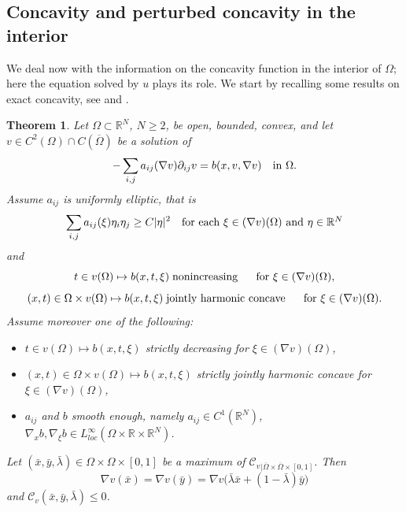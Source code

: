 \documentclass[11pt, reqno]{amsart}
\newtheorem{theorem}[lemma]{Theorem}
\theoremstyle{definition}
\numberwithin{equation}{section}
\newcommand{\R}{\mathbb{R}}
\newcommand{\mc}[1]{\mathcal{#1}}
\begin{document}
 \subsection{Concavity and perturbed concavity in the interior}
\label{sec_concav_interior}

We deal now with the information on the concavity function in the interior of $\Omega$; here the equation solved by $u$ plays its role.
We start by recalling some results on exact concavity, see \cite[Theorem 3.1]{Ken85} and \cite[Proposition 2.1]{MRS24}.

\begin{theorem}
\label{thm_concav_inter_class}
Let $\Omega \subset \R^N$, $N\geq 2$, be open, bounded, 
convex, and let $v \in C^2(\Omega) \cap C(\overline{\Omega})$ be a solution of
$$-\sum_{i,j} a_{ij}(\nabla v) \partial_{ij} v = b(x,v,\nabla v) \quad \hbox{in $\Omega$}.$$
Assume $a_{ij}$ is uniformly elliptic, that is 
\begin{equation}\label{eq_strict_elliptic}
 \sum_{i,j} a_{ij}(\xi) \eta_i \eta_j \geq C |\eta|^2 \quad \hbox{for each $\xi \in (\nabla v)(\Omega)$ and $\eta \in \R^N$}
 \end{equation}
and 
$$t \in v(\Omega) \mapsto b(x,t, \xi) \; \hbox{nonincreasing $\quad$ for $\xi \in (\nabla v)(\Omega)$},$$
$$(x,t) \in \Omega \times v(\Omega) \mapsto b(x, t, \xi) \; \hbox{jointly harmonic concave $\quad$ for $\xi \in (\nabla v)(\Omega)$}.$$
Assume moreover one of the following:
\begin{itemize}
\item $t \in v(\Omega) \mapsto b(x, t, \xi)$ strictly decreasing for $\xi \in (\nabla v)(\Omega)$,
\item $(x,t) \in \Omega \times v(\Omega) \mapsto b(x, t, \xi) $ strictly jointly harmonic concave for $\xi \in (\nabla v)(\Omega)$,
\item $a_{ij}$ and $b$ smooth enough, namely $a_{ij} \in C^1(\R^N)$, $\nabla_x b, \nabla_{\xi} b \in L^{\infty}_{loc}(\Omega\times \R\times\R^N)$.
\end{itemize}
Let $(\bar{x},\bar{y},\bar{\lambda}) \in \Omega \times \Omega \times [0,1]$ be a maximum of $\mc{C}_v$$_{|\overline{\Omega} \times \overline{\Omega} \times [0,1]}$. Then 
$$\nabla v(\bar{x}) = \nabla v(\bar{y}) = \nabla v \big(\bar{\lambda}\bar{x} + (1-\bar{\lambda})\bar{y}\big)$$
and 
$\mc{C}_v(\bar{x},\bar{y},\bar{\lambda}) \leq 0$. 
\end{theorem}
\end{document}
